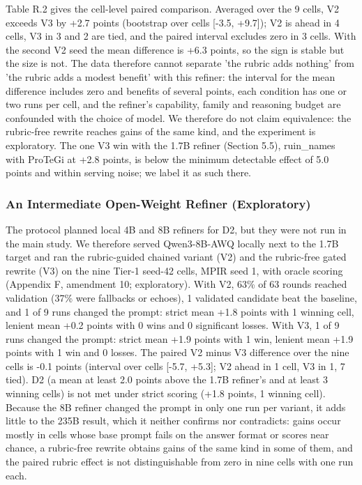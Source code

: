 \documentclass{ieeeaccess}
\begin{document}
Table R.2 gives the cell-level paired comparison. Averaged over the 9 cells, V2 exceeds V3 by +2.7 points (bootstrap over cells [-3.5, +9.7]); V2 is ahead in 4 cells, V3 in 3 and 2 are tied, and the paired interval excludes zero in 3 cells. With the second V2 seed the mean difference is +6.3 points, so the sign is stable but the size is not. The data therefore cannot separate 'the rubric adds nothing' from 'the rubric adds a modest benefit' with this refiner: the interval for the mean difference includes zero and benefits of several points, each condition has one or two runs per cell, and the refiner's capability, family and reasoning budget are confounded with the choice of model. We therefore do not claim equivalence: the rubric-free rewrite reaches gains of the same kind, and the experiment is exploratory. The one V3 win with the 1.7B refiner (Section 5.5), ruin\_\allowbreak{}names with ProTeGi at +2.8 points, is below the minimum detectable effect of 5.0 points and within serving noise; we label it as such there.

\subsubsection{An Intermediate Open-Weight Refiner (Exploratory)}

The protocol planned local 4B and 8B refiners for D2, but they were not run in the main study. We therefore served Qwen3-8B-AWQ locally next to the 1.7B target and ran the rubric-guided chained variant (V2) and the rubric-free gated rewrite (V3) on the nine Tier-1 seed-42 cells, MPIR seed 1, with oracle scoring (Appendix F, amendment 10; exploratory). With V2, 63\% of 63 rounds reached validation (37\% were fallbacks or echoes), 1 validated candidate beat the baseline, and 1 of 9 runs changed the prompt: strict mean +1.8 points with 1 winning cell, lenient mean +0.2 points with 0 wins and 0 significant losses. With V3, 1 of 9 runs changed the prompt: strict mean +1.9 points with 1 win, lenient mean +1.9 points with 1 win and 0 losses. The paired V2 minus V3 difference over the nine cells is -0.1 points (interval over cells [-5.7, +5.3]; V2 ahead in 1 cell, V3 in 1, 7 tied). D2 (a mean at least 2.0 points above the 1.7B refiner's and at least 3 winning cells) is not met under strict scoring (+1.8 points, 1 winning cell). Because the 8B refiner changed the prompt in only one run per variant, it adds little to the 235B result, which it neither confirms nor contradicts: gains occur mostly in cells whose base prompt fails on the answer format or scores near chance, a rubric-free rewrite obtains gains of the same kind in some of them, and the paired rubric effect is not distinguishable from zero in nine cells with one run each.
\end{document}
